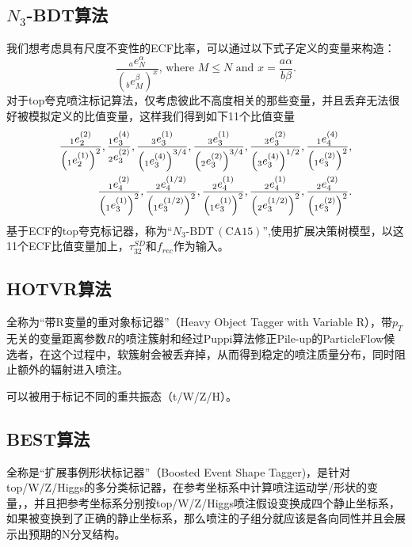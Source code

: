 \subsection{$N_3$-BDT算法}
我们想考虑具有尺度不变性的ECF比率，可以通过以下式子定义的变量来构造：
\begin{equation}
    \frac{{}_{a}e_{N}^{\alpha}}{(_{b}e_{M}^{\beta})^{x}}\text{, where }M\leq N%
\text{ and }x=\frac{a\alpha}{b\beta}.
\end{equation}
对于top夸克喷注标记算法，仅考虑彼此不高度相关的那些变量，并且丢弃无法很好被模拟定义的比值变量，这样我们得到如下11个比值变量
\begin{equation}
\begin{split}
\displaystyle\frac{{}_{1}e_{2}^{(2)}}{\Bigl{(}{}_{1}e_{2}^{(1)}\Bigr{)}^{2}},%
\frac{{}_{1}e_{3}^{(4)}}{{}_{2}e_{3}^{(2)}},\frac{{}_{3}e_{3}^{(1)}}{\Bigl{(}{%
}_{1}e_{3}^{(4)}\Bigr{)}^{3/4}},\displaystyle\frac{{}_{3}e_{3}^{(1)}}{\Bigl{(}{}_{2}e_{3}^{(2)}\Bigr{)}^{3/4}}%
,\frac{{}_{3}e_{3}^{(2)}}{\Bigl{(}{}_{3}e_{3}^{(4)}\Bigr{)}^{1/2}},
\displaystyle\frac{{}_{1}e_{4}^{(4)}}{\Bigl{(}{}_{1}e_{3}^{(2)}\Bigr{)}^{2}},\\
\frac{{}_{1}e_{4}^{(2)}}{\Bigl{(}{}_{1}e_{3}^{(1)}\Bigr{)}^{2}},\frac{{}_{2}e_%
{4}^{(1/2)}}{\Bigl{(}{}_{1}e_{3}^{(1/2)}\Bigr{)}^{2}},\displaystyle\frac{{}_{2}e_{4}^{(1)}}{\Bigl{(}{}_{1}e_{3}^{(1)}\Bigr{)}^{2}},%
\frac{{}_{2}e_{4}^{(1)}}{\Bigl{(}{}_{2}e_{3}^{(1/2)}\Bigr{)}^{2}},\frac{{}_{2}%
e_{4}^{(2)}}{\Bigl{(}{}_{1}e_{3}^{(2)}\Bigr{)}^{2}}.
\end{split}
\end{equation}
基于ECF的top夸克标记器，称为“$N_{3}\text{-}\mathrm{BDT}\,(\mathrm{CA}15)$”,使用扩展决策树模型，以这11个ECF比值变量加上，$\tau^{SD}_{32}\text{和}f_{rec}$作为输入。
\subsection{HOTVR算法}
全称为“带R变量的重对象标记器”（Heavy Object Tagger with Variable R），带$p_T$无关的变量距离参数$R$的喷注簇射和经过Puppi算法修正Pile-up的ParticleFlow候选者，在这个过程中，软簇射会被丢弃掉，从而得到稳定的喷注质量分布，同时阻止额外的辐射进入喷注。

可以被用于标记不同的重共振态（t/W/Z/H）。
\subsection{BEST算法}
全称是“扩展事例形状标记器”（Boosted Event Shape Tagger)，是针对top/W/Z/Higgs的多分类标记器，在参考坐标系中计算喷注运动学/形状的变量，，并且把参考坐标系分别按top/W/Z/Higgs喷注假设变换成四个静止坐标系，如果被变换到了正确的静止坐标系，那么喷注的子组分就应该是各向同性并且会展示出预期的N分叉结构。

